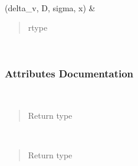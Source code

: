 \documentclass[letterpaper,10pt,english]{sphinxmanual}
\begin{document}
\begin{fulllineitems}
\begin{savenotes}
\begin{longtable}[c]{}
\begin{quote}
\begin{description}
\end{description}\end{quote}

\\
\hline
\sphinxAtStartPar
{\hyperref[\detokenize{api/seyfert.cosmology.bias.VdnVoidBias:seyfert.cosmology.bias.VdnVoidBias.voidMultiplicity}]{}}(delta\_v, D, sigma, x)
&
\sphinxAtStartPar
\begin{quote}\begin{description}
\item[{rtype}] \leavevmode
\sphinxAtStartPar
{}

\end{description}\end{quote}

\\
\hline
\end{longtable}\sphinxatlongtableend\end{savenotes}
\subsubsection*{Attributes Documentation}

\begin{fulllineitems}
\label{\detokenize{api/seyfert.cosmology.bias.VdnVoidBias:seyfert.cosmology.bias.VdnVoidBias.R_max_Mpc}}~\begin{quote}\begin{description}
\item[{Return type}] \leavevmode
\sphinxAtStartPar
{}

\end{description}\end{quote}

\end{fulllineitems}


\begin{fulllineitems}
\label{\detokenize{api/seyfert.cosmology.bias.VdnVoidBias:seyfert.cosmology.bias.VdnVoidBias.R_min_Mpc}}~\begin{quote}\begin{description}
\item[{Return type}] \leavevmode
\sphinxAtStartPar
{}


\end{description}
\end{quote}
\end{fulllineitems}
\end{fulllineitems}
\end{document}
